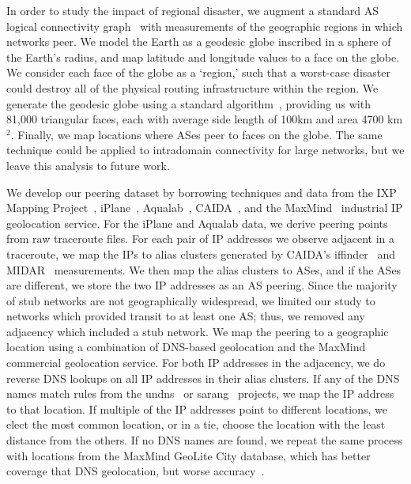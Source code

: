 
    In order to study the impact of regional disaster, we augment a standard AS logical connectivity graph~\cite{caida-asgraph} with measurements of the geographic regions in which networks peer.
    We model the Earth as a geodesic globe inscribed in a sphere of the Earth's radius, and map latitude and longitude values to a face on the globe.
    We consider each face of the globe as a `region,' such that a worst-case disaster could destroy all of the physical routing infrastructure within the region.
    We generate the geodesic globe using a standard algorithm~\cite{geodesic}, providing us with 81,000 triangular faces, each with average side length of 100km and area 4700 km$^2$.  
    Finally, we map locations where ASes peer to faces on the globe.
    The same technique could be applied to intradomain connectivity for large networks, but we leave this analysis to future work.    
 
    We develop our peering dataset by borrowing techniques and data from
    the IXP
    Mapping Project~\cite{ixps-mapped}, iPlane~\cite{iplane},
    Aqualab~\cite{sidewalk},
    CAIDA~\cite{caidadata}, and the MaxMind~\cite{maxmind} industrial IP geolocation service.
    For the iPlane and Aqualab data, we derive peering points from raw traceroute files.
    For each pair of IP addresses we observe adjacent in a traceroute, we map the IPs to alias clusters generated by CAIDA's iffinder~\cite{iffinder} and MIDAR~\cite{iffinder, midar} measurements.
    We then map the alias clusters to ASes, and if the ASes are different, we store the two IP addresses as an AS peering.
    Since the majority of stub networks are not geographically widespread, we limited our study to networks which provided transit to at least one AS; thus, we removed any adjacency which included a stub network.
    We map the peering to a geographic location using a combination of DNS-based geolocation and the MaxMind commercial geolocation service.
    For both IP addresses in the adjacency, we do reverse DNS lookups on all IP addresses in their alias clusters. 
    If any of the DNS names match rules from the undns~\cite{undns} or sarang~\cite{sarang} projects, we map the IP address to that location. 
    If multiple of the IP addresses point to different locations, we elect the most common location, or in a tie, choose the location with the least distance from the others.
    If no DNS names are found, we repeat the same process with locations from the MaxMind GeoLite City database, which has better coverage that DNS geolocation, but worse accuracy~\cite{uhlig_ccr_paper}. 
    
